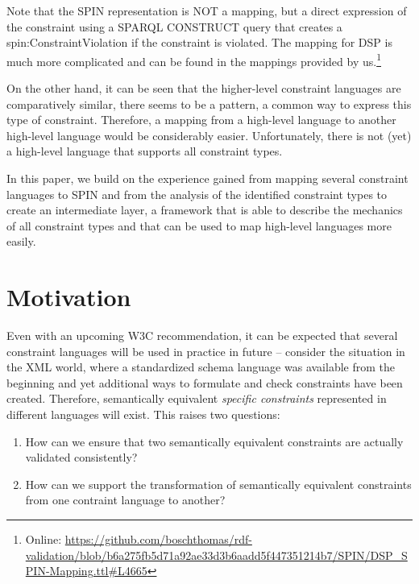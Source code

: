 \documentclass[a4paper,fontsize=11pt]{scrartcl}
\begin{document}
Note that the SPIN representation is NOT a mapping, but a direct expression of the constraint using a SPARQL CONSTRUCT query that creates a spin:ConstraintViolation if the constraint is violated. The mapping for DSP is much more complicated and can be found in the mappings provided by us.\footnote{Online: \url{https://github.com/boschthomas/rdf-validation/blob/b6a275fb5d71a92ae33d3b6aadd5f447351214b7/SPIN/DSP_SPIN-Mapping.ttl#L4665}}

On the other hand, it can be seen that the higher-level constraint languages are comparatively similar, there seems to be a pattern, a common way to express this type of constraint. Therefore, a mapping from a high-level language to another high-level language would be considerably easier. Unfortunately, there is not (yet) a high-level language that supports all constraint types. 

In this paper, we build on the experience gained from mapping several constraint languages to SPIN and from the analysis of the identified constraint types to create an intermediate layer, a framework that is able to describe the mechanics of all constraint types and that can be used to map high-level languages more easily. 



\section{Motivation}

Even with an upcoming W3C recommendation, it can be expected that several constraint languages will be used in practice in future -- consider the situation in the XML world, where a standardized schema language was available from the beginning and yet additional ways to formulate and check constraints have been created. Therefore, 
semantically equivalent \emph{specific constraints} represented in different languages will exist.
This raises two questions: 
\begin{enumerate}
 \item How can we ensure that two semantically equivalent constraints are actually validated consistently?
 \item How can we support the transformation of semantically equivalent constraints from one contraint language to another?
\end{enumerate}
\end{document}
